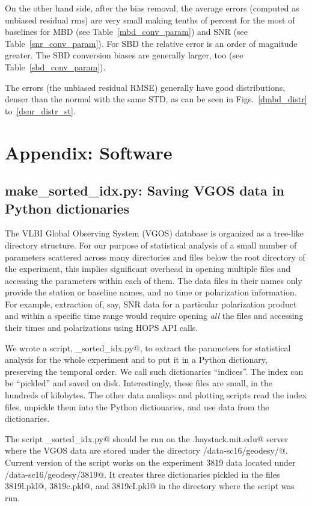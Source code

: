 \documentclass[letterpaper,twoside,12pt]{article}
\begin{document}
On the other hand side, after the bias removal, the average errors (computed as unbiased residual rms) are very small making tenths of percent for the most of baselines for MBD (see Table~\ref{mbd_conv_param}) and SNR (see Table~\ref{snr_conv_param}). For SBD the relative error is an order of magnitude greater. The SBD conversion biases are generally larger, too (see Table~\ref{sbd_conv_param}).

The errors (the unbiased residual RMSE) generally have good distributions, denser than the normal with the same STD, as can be seen in Figs.~\ref{dmbd_distr} to~\ref{dsnr_distr_st}.

\cleardoublepage

\section{Appendix: Software}

\subsection{make\_sorted\_idx.py: Saving VGOS data in Python dictionaries}

The VLBI Global Observing System (VGOS) database is organized as a tree-like directory structure. For our purpose of statistical analysis of a small number of parameters scattered across many directories and files below the root directory of the experiment, this implies significant overhead in opening multiple files and accessing the parameters within each of them. The data files in their names only provide the station or baseline names, and no time or polarization information. For example, extraction of, say, SNR data for a particular polarization product and within a specific time range would require opening \emph{all} the files and accessing their times and polarizations using HOPS API calls.

We wrote a script, \verb@make_sorted_idx.py@, to extract the parameters for statistical analysis for the whole experiment and to put it in a Python dictionary, preserving the temporal order. We call such dictionaries ``indices''. The index can be ``pickled'' and saved on disk. Interestingly, these files are small, in the hundreds of kilobytes.  The other data analisys and plotting scripts read the index files, unpickle them into the Python dictionaries, and use data from the dictionaries.

The script \verb@make_sorted_idx.py@ should be run on the \verb@demi.haystack.mit.edu@ server where the VGOS data are stored under the directory \verb@/data-sc16/geodesy/@. Current version of the script works on the experiment 3819 data located under \verb@/data-sc16/geodesy/3819@. It creates three dictionaries pickled in the files \verb@idx3819l.pkl@, \verb@idx3819c.pkl@, and \verb@idx3819cI.pkl@ in the directory where the script was run. 
\end{document}
